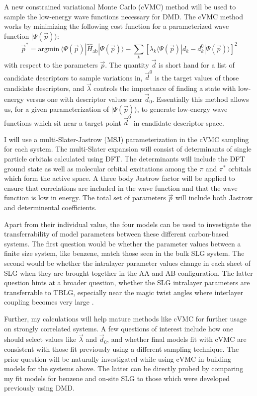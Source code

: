 \documentclass[12pt]{article}
\begin{document}
A new constrained variational Monte Carlo (cVMC) method will be used to sample the low-energy wave functions necessary for DMD.
The cVMC method works by minimizing the following cost function for a parameterized wave function $|\Psi(\vec{p})\rangle$:
\begin{equation}
\vec{p}^* = \text{argmin} \ \langle \Psi(\vec{p}) | \hat{H}_\text{ab} | \Psi(\vec{p}) \rangle - \sum_k [\lambda_k \langle \Psi(\vec{p}) | d_k - d_{k}^0 | \Psi(\vec{p}) \rangle]^2
\end{equation}
with respect to the parameters $\vec{p}$.
The quantity $\vec{d}$ is short hand for a list of candidate descriptors to sample variations in, $\vec{d}^0$ is the target values of those candidate descriptors, and $\vec{\lambda}$ controls the importance of finding a state with low-energy versus one with descriptor values near $\vec{d}_0$.
Essentially this method allows us, for a given parameterization of $|\Psi(\vec{p})\rangle$, to generate low-energy wave functions which sit near a target point $\vec{d}^0$ in candidate descriptor space.

I will use a multi-Slater-Jastrow (MSJ) parameterization in the cVMC sampling for each system.
The multi-Slater expansion will consist of determinants of single particle orbitals calculated using DFT.
The determinants will include the DFT ground state as well as molecular orbital excitations among the $\pi$ and $\pi^*$ orbitals which form the active space.
A three body Jastrow factor will be applied to ensure that correlations are included in the wave function and that the wave function is low in energy.
The total set of parameters $\vec{p}$ will include both Jastrow and determinental coefficients.

Apart from their individual value, the four models can be used to investigate the transferrability of model parameters between these different carbon-based systems.
The first question would be whether the parameter values between a finite size system, like benzene, match those seen in the bulk SLG system.
The second would be whether the intralayer parameter values change in each sheet of SLG when they are brought together in the AA and AB configuration.
The latter question hints at a broader question, whether the SLG intralayer parameters are transferrable to TBLG, especially near the magic twist angles where interlayer coupling becomes very large \cite{Bistritzer2	011}.

Further, my calculations will help mature methods like cVMC for further usage on strongly correlated systems.
A few questions of interest include how one should select values like $\vec{\lambda}$ and $\vec{d}_0$, and whether final models fit with cVMC are consistent with those fit previously using a different sampling technique.
The prior question will be naturally investigated while using cVMC in building models for the systems above.
The latter can be directly probed by comparing my fit models for benzene and on-site SLG to those which were developed previously using DMD.
\end{document}
